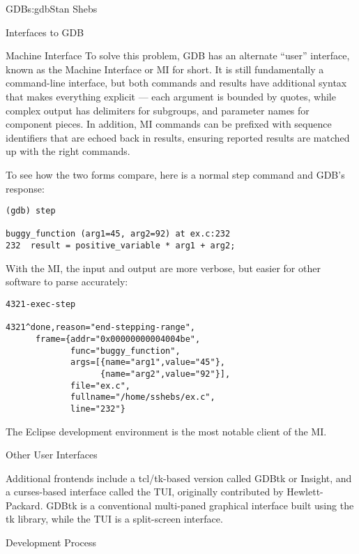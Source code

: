 \begin{aosachapter}{GDB}{s:gdb}{Stan Shebs}
\begin{aosasect1}{Interfaces to GDB}
\begin{aosasect2}{Machine Interface}
To solve this problem, GDB has an alternate ``user'' interface, known
as the Machine Interface or MI for short.  It is still fundamentally a
command-line interface, but both commands and results have additional
syntax that makes everything explicit --- each argument is bounded by
quotes, while complex output has delimiters for subgroups, and
parameter names for component pieces.  In addition, MI commands can be
prefixed with sequence identifiers that are echoed back in results,
ensuring reported results are matched up with the right commands.

To see how the two forms compare, here is a normal step command
and GDB's response:

\begin{verbatim}
(gdb) step

buggy_function (arg1=45, arg2=92) at ex.c:232
232  result = positive_variable * arg1 + arg2;
\end{verbatim}

With the MI, the input and output are more verbose, but easier for
other software to parse accurately:

\begin{verbatim}
4321-exec-step

4321^done,reason="end-stepping-range",
      frame={addr="0x00000000004004be",
             func="buggy_function",
             args=[{name="arg1",value="45"},
                   {name="arg2",value="92"}],
             file="ex.c",
             fullname="/home/sshebs/ex.c",
             line="232"}
\end{verbatim}

The Eclipse\cite{bib:eclipse-home} development environment is the most
notable client of the MI.

\end{aosasect2}

\begin{aosasect2}{Other User Interfaces}

Additional frontends include a tcl/tk-based version called GDBtk or
Insight, and a curses-based interface called the TUI, originally
contributed by Hewlett-Packard.  GDBtk is a conventional multi-paned
graphical interface built using the tk library, while the TUI is a
split-screen interface.

\end{aosasect2}

\end{aosasect1}

\begin{aosasect1}{Development Process}


\end{aosasect1}
\end{aosachapter}
